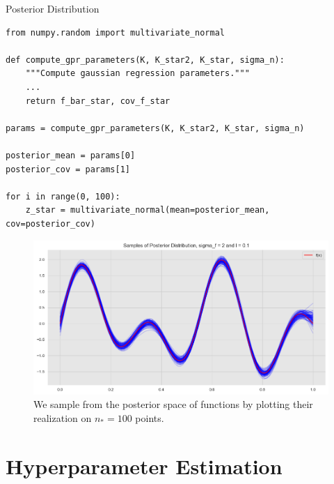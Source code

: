 \documentclass[10pt]{beamer}
\begin{document}
\begin{frame}[fragile]{Posterior Distribution}
\begin{lstlisting}
from numpy.random import multivariate_normal

def compute_gpr_parameters(K, K_star2, K_star, sigma_n):
    """Compute gaussian regression parameters."""
    ...
    return f_bar_star, cov_f_star

params = compute_gpr_parameters(K, K_star2, K_star, sigma_n)

posterior_mean = params[0]
posterior_cov = params[1]

for i in range(0, 100):
    z_star = multivariate_normal(mean=posterior_mean, cov=posterior_cov)
\end{lstlisting}
\begin{center}
\begin{figure}
\includegraphics[scale=0.23]{images/gaussian_process_regression_files/gaussian_process_regression_57_0.png} 
\caption{We sample from the posterior space of functions by plotting their realization on $n_*=100$ points. }
\end{figure}
\end{center}
\end{frame}

\section{Hyperparameter Estimation}
\end{document}
